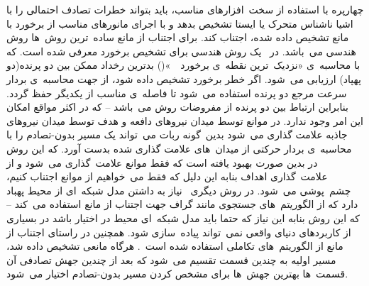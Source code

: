 چهارپره با استفاده از سخت\ افزارهای مناسب، باید بتواند خطرات تصادف احتمالی را با اشیا ناشناس متحرک یا ایستا تشخیص بدهد و با اجرای مانورهای مناسب از برخورد با مانع تشخیص داده شده،‌ اجتناب کند. برای اجتناب از مانع ساده\ ترین روش\ ها روش هندسی می\ باشد. در\
\cite{park2008uav}
یک روش هندسی برای تشخیص برخورد معرفی شده است. که با محاسبه\ ی «نزدیک\ ترین نقطه\ ی برخورد\
\
»() بدترین رخداد ممکن بین دو پرنده(دو پهپاد) ارزیابی می\ شود. اگر خطر برخورد تشخیص داده شود، از  جهت محاسبه\ ی بردار سرعت مرجع دو پرنده استفاده می\ شود تا فاصله\ ی مناسب از یکدیگر حفظ گردد. بنابراین ارتباط بین دو پرنده از مفروضات روش می\ باشد -- که در اکثر مواقع امکان این امر وجود ندارد.
در
\cite{khatib1986real}
موانع توسط میدان نیروهای دافعه\زیرنویس{\lr{Repulsive Force Field}} و هدف توسط میدان نیروهای جاذبه علامت گذاری می\ شود بدین\ گونه ربات می\ تواند یک مسیر بدون-تصادم را با محاسبه\ ی بردار حرکتی از میدان\ های علامت گذاری شده بدست آورد. که این روش در
\cite{kandil2010collision}
بدین صورت بهبود یافته است که فقط موانع علامت\ گذاری می\ شود و از علامت\ گذاری اهداف بنابه این دلیل که فقط می\ خواهیم از موانع اجتناب کنیم، چشم\ پوشی می\ شود.
در روش دیگری\
\cite{gardiner2011collision}
نیاز به داشتن مدل شبکه\ ای از محیط پهباد دارد که از الگوریتم\ های جستجوی مانند  گراف جهت اجتناب از مانع استفاده می\ کند -- که این روش بنابه این نیاز که حتما باید مدل شبکه\ ای محیط در اختیار باشد در بسیاری از کاربردهای دنیای واقعی نمی\ تواند پیاده\ سازی شود. همچنین در راستای اجتناب از مانع از الگوریتم\ های تکاملی استفاده شده است\
\cite{rathbun2002evolution}.
هرگاه مانعی تشخیص داده شد، مسیر اولیه به چندین قسمت تقسیم می\ شود که بعد از چندین جهش تصادفی آن قسمت\ ها بهترین جهش\ ها برای مشخص کردن مسیر بدون-تصادم اختیار می\ شود.